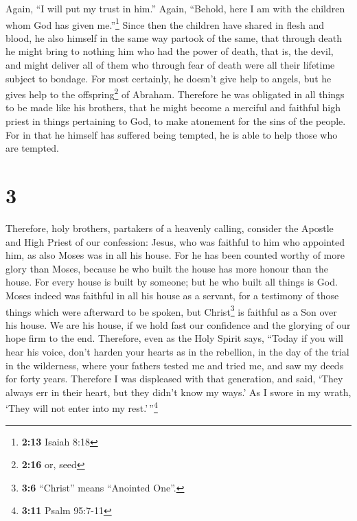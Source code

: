  Again, ``I will put my trust in him.'' Again, ``Behold,
here I am with the children whom God has given me.''\footnote{\textbf{2:13}
  Isaiah 8:18}  Since then the children have shared in
flesh and blood, he also himself in the same way partook of the same,
that through death he might bring to nothing him who had the power of
death, that is, the devil,  and might deliver all of them
who through fear of death were all their lifetime subject to bondage.
 For most certainly, he doesn't give help to angels, but
he gives help to the offspring\footnote{\textbf{2:16} or, seed} of
Abraham.  Therefore he was obligated in all things to be
made like his brothers, that he might become a merciful and faithful
high priest in things pertaining to God, to make atonement for the sins
of the people.  For in that he himself has suffered being
tempted, he is able to help those who are tempted.

\hypertarget{section-2}{%
\section{3}\label{section-2}}

 Therefore, holy brothers, partakers of a heavenly
calling, consider the Apostle and High Priest of our confession: Jesus,
 who was faithful to him who appointed him, as also Moses
was in all his house.  For he has been counted worthy of
more glory than Moses, because he who built the house has more honour
than the house.  For every house is built by someone; but
he who built all things is God.  Moses indeed was faithful
in all his house as a servant, for a testimony of those things which
were afterward to be spoken,  but Christ\footnote{\textbf{3:6}
  ``Christ'' means ``Anointed One''.} is faithful as a Son over his
house. We are his house, if we hold fast our confidence and the glorying
of our hope firm to the end.  Therefore, even as the Holy
Spirit says, ``Today if you will hear his voice,  don't
harden your hearts as in the rebellion, in the day of the trial in the
wilderness,  where your fathers tested me and tried me,
and saw my deeds for forty years.  Therefore I was
displeased with that generation, and said, `They always err in their
heart, but they didn't know my ways.'  As I swore in my
wrath, `They will not enter into my rest.'\,''\footnote{\textbf{3:11}
  Psalm 95:7-11}

